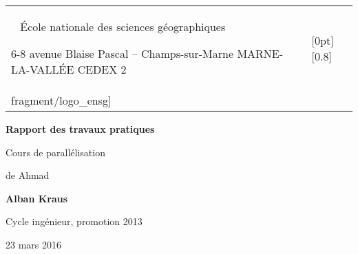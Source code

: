 \newlength\ensg
\settowidth{}

\begin{titlepage}

  \AddToShipoutPicture*{\BackgroundPic}

  \begin{flushright}
    \begin{tabular}{p{\ensg} p{}}
      {%
      \small
      ~\newline
      École nationale des sciences géographiques

      6-8 avenue Blaise Pascal -- Champs-sur-Marne\newline
      77455 MARNE-LA-VALLÉE CEDEX 2
      } & \raisebox{-0.9\height}[0pt][0.8\height]{%
          \texttt{[image: \\fragment/logo\_ensg]}%
          } \\
    \end{tabular}
  \end{flushright}

  \begin{center}
    \textheight

    \begin{framed}
      \bigskip

      \Huge\sffamily\bfseries
      Rapport des travaux pratiques

      \bigskip

      \LARGE\rmfamily\mdseries
      Cours de parallélisation

      de Ahmad 

      \bigskip
    \end{framed}

    \textheight

    \bfseries\Large
    Alban Kraus
    
    \smallskip

    \normalsize\mdseries
    Cycle ingénieur, promotion 2013

    \textheight

    23 mars 2016
  \end{center}
\end{titlepage}


